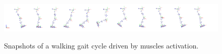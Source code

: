 \begin{figure}[t!]
\centering
\includegraphics[width=\textwidth]{figures/multiphase_walking_cycle.png}\\
\caption{Snapshots of a walking gait cycle driven by muscles activation.}
\label{fig:snapshots_multiphase_walking_cycle}
\end{figure}

